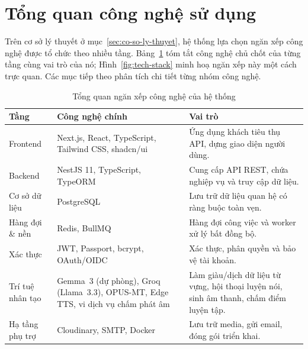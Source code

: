\section{Tổng quan công nghệ sử dụng}
\label{sec:tong-quan-cong-nghe}

Trên cơ sở lý thuyết ở mục~\ref{sec:co-so-ly-thuyet}, hệ thống lựa chọn ngăn
xếp công nghệ được tổ chức theo nhiều tầng. Bảng~\ref{tab:tech-overview}
tóm tắt công nghệ chủ chốt của từng tầng cùng vai trò của nó;
Hình~\ref{fig:tech-stack} minh hoạ ngăn xếp này một cách trực quan. Các mục
tiếp theo phân tích chi tiết từng nhóm công nghệ.

\begin{table}[h]
  \centering
  \small
  \renewcommand{\arraystretch}{1.3}
  \begin{tabular}{|p{3.0cm}|p{5.0cm}|p{6.4cm}|}
    \hline
    \textbf{Tầng} & \textbf{Công nghệ chính} & \textbf{Vai trò} \\
    \hline
    Frontend & Next.js, React, TypeScript, Tailwind CSS, shadcn/ui & Ứng dụng khách tiêu thụ API, dựng giao diện người dùng. \\
    \hline
    Backend & NestJS 11, TypeScript, TypeORM & Cung cấp API REST, chứa nghiệp vụ và truy cập dữ liệu. \\
    \hline
    Cơ sở dữ liệu & PostgreSQL & Lưu trữ dữ liệu quan hệ có ràng buộc toàn vẹn. \\
    \hline
    Hàng đợi \& nền & Redis, BullMQ & Hàng đợi công việc và worker xử lý bất đồng bộ. \\
    \hline
    Xác thực & JWT, Passport, bcrypt, OAuth/OIDC & Xác thực, phân quyền và bảo vệ tài khoản. \\
    \hline
    Trí tuệ nhân tạo & Gemma~3 (dự phòng), Groq (Llama~3.3), OPUS-MT, Edge TTS, vi dịch vụ chấm phát âm & Làm giàu/dịch dữ liệu từ vựng, hội thoại luyện nói, sinh âm thanh, chấm điểm luyện tập. \\
    \hline
    Hạ tầng phụ trợ & Cloudinary, SMTP, Docker & Lưu trữ media, gửi email, đóng gói triển khai. \\
    \hline
  \end{tabular}
  \caption{Tổng quan ngăn xếp công nghệ của hệ thống}
  \label{tab:tech-overview}
\end{table}


